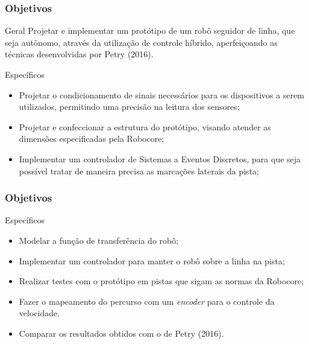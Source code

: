 \begin{frame}
\frametitle{Objetivos}
\begin{block}{Geral}
	 Projetar e implementar um protótipo de um robô seguidor de linha, que seja autônomo, através da utilização de controle híbrido, aperfeiçoando as técnicas desenvolvidas por Petry (2016).
\end{block}

\begin{block}{Específicos}
	\begin{itemize}
	\item Projetar o condicionamento de sinais necessários para os dispositivos a serem utilizados, permitindo uma precisão na leitura dos sensores;
	\item Projetar e confeccionar a estrutura do protótipo, visando atender as dimensões especificadas pela Robocore;
	\item Implementar um controlador de Sistemas a Eventos Discretos, para que seja possível tratar de maneira precisa as marcações laterais da pista;

	\end{itemize}
\end{block}

\end{frame}

\begin{frame}
\frametitle{Objetivos}
\begin{block}{Específicos}
	\begin{itemize}
	\item Modelar a função de transferência do robô;
	\item Implementar um controlador para manter o robô sobre a linha na pista;
	\item Realizar testes com o protótipo em pistas que sigam as normas da Robocore;
	\item Fazer o mapeamento do percurso com um \textit{encoder} para o controle da velocidade.
	\item Comparar os resultados obtidos com o de Petry (2016).
	\end{itemize}
\end{block}

\end{frame}


